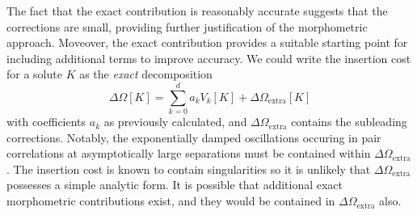 \documentclass[11pt,twoside]{report}
\begin{document}
The fact that the exact contribution is reasonably accurate suggests that the corrections are small, providing further justification of the morphometric approach.
Moveover, the exact contribution provides a suitable starting point for including additional terms to improve accuracy.
We could write the insertion cost for a solute $K$ as the \emph{exact} decomposition
\begin{equation}\label{eq:exact-morph-decomposition}
  \Delta \Omega[K]
  =
  \sum_{k=0}^d a_k V_k[K]
  + \Delta \Omega_\mathrm{extra}[K]
\end{equation}
with coefficients $a_k$ as previously calculated, and $\Delta \Omega_\mathrm{extra}$ contains the subleading corrections.
Notably, the exponentially damped oscillations occuring in pair correlations at asymptotically large separations must be contained within $\Delta \Omega_\mathrm{extra}$.
The insertion cost is known to contain singularities%
so it is unlikely that $\Delta \Omega_\mathrm{extra}$ possesses a simple analytic form.
It is possible that additional exact morphometric contributions exist, and they would be contained in $\Delta \Omega_\mathrm{extra}$ also.
\end{document}
